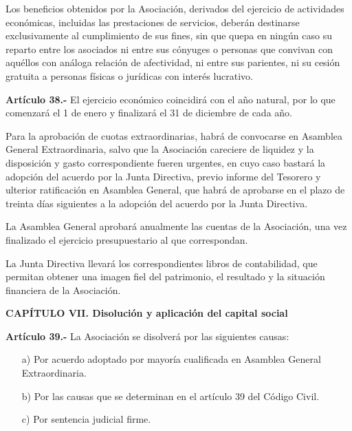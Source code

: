 \documentclass[a4paper,12pt]{article}
\begin{document}
\begin{onehalfspace}
Los beneficios obtenidos por la Asociación, derivados del ejercicio de actividades económicas, incluidas las prestaciones de servicios, deberán destinarse exclusivamente al cumplimiento de sus fines, sin que quepa en ningún caso su reparto entre los asociados ni entre sus cónyuges o personas que convivan con aquéllos con análoga relación de afectividad, ni entre sus parientes, ni su cesión gratuita a personas físicas o jurídicas con interés lucrativo.

\bigskip\bigskip

\textbf{Artículo 38.-} El ejercicio económico coincidirá con el año natural, por lo que comenzará el 1 de enero y finalizará el 31 de diciembre de cada año.

Para la aprobación de cuotas extraordinarias, habrá de convocarse en Asamblea General Extraordinaria, salvo que la Asociación careciere de liquidez y la disposición y gasto correspondiente fueren urgentes, en cuyo caso bastará la adopción del acuerdo por la Junta Directiva, previo informe del Tesorero y ulterior ratificación en Asamblea General, que habrá de aprobarse en el plazo de treinta días siguientes a la adopción del acuerdo por la Junta Directiva.

La Asamblea General aprobará anualmente las cuentas de la Asociación, una vez finalizado el ejercicio presupuestario al que correspondan.

La Junta Directiva llevará los correspondientes libros de contabilidad, que permitan obtener una imagen fiel del patrimonio, el resultado y la situación financiera de la Asociación.

\bigskip\bigskip

\begin{center}
\textbf{CAPÍTULO VII. Disolución y aplicación del capital social}
\end{center}

\bigskip\bigskip

\textbf{Artículo 39.-} La Asociación se disolverá por las siguientes causas:
\begin{itemize}
\item [a)] Por acuerdo adoptado por mayoría cualificada en Asamblea General Extraordinaria.
\item [b)] Por las causas que se determinan en el artículo 39 del Código Civil.
\item [c)] Por sentencia judicial firme.
\end{itemize}

\bigskip\bigskip


\end{onehalfspace}
\end{document}
